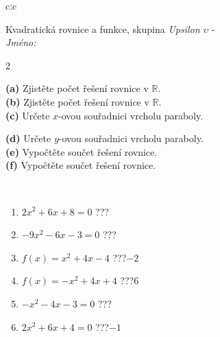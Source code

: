\documentclass[10pt]{report}
\begin{document}
\begin{tabular}{c:c}
\begin{minipage}[c][104.5mm][t]{0.5\linewidth}
\begin{center}
\vspace{7mm}
{\huge \LARGE Kvadratická rovnice a funkce, skupina \textit{Upsilon $\upsilon$} -}\\[5mm]
\textit{Jméno:}\phantom{xxxxxxxxxxxxxxxxxxxxxxxxxxxxxxxxxxxxxxxxxxxxxxxxxxxxxxxxxxxxxxxxx}\\[5mm]
\begin{minipage}{0.95\linewidth}
\begin{center}
{\small \begin{multicols}{2} \raggedright
\textbf{(a)} Zjistěte počet řešení rovnice v \(\mathbb{R}\). \\[1mm]
\textbf{(b)} Zjistěte počet řešení rovnice v \(\mathbb{R}\). \\[1mm]
\textbf{(c)} Určete \(x\)-ovou souřadnici vrcholu paraboly. \par \columnbreak
\textbf{(d)} Určete \(y\)-ovou souřadnici vrcholu paraboly. \\[1mm]
\textbf{(e)} Vypočtěte součet řešení rovnice. \\[1mm]
\textbf{(f)} Vypočtěte součet řešení rovnice.
\end{multicols}
}
\end{center}
\end{minipage}
\\[4mm]
\begin{minipage}{0.79\linewidth}
\begin{center}
\begin{varwidth}{\linewidth}
\begin{enumerate}
\Large
\item $2x^2+6x+8=0$\quad \dotfill\; ???\;\dotfill {}
\item $-9x^2-6x-3=0$\quad \dotfill\; ???\;\dotfill {}
\item $f(x)=x^2+4x-4$\quad \dotfill\; ???\;\dotfill \quad $-2$
\item $f(x)=-x^2+4x+4$\quad \dotfill\; ???\;\dotfill \quad $6$
\item $-x^2-4x-3=0$\quad \dotfill\; ???\;\dotfill {}
\item $2x^2+6x+4=0$\quad \dotfill\; ???\;\dotfill \quad $-1$
\end{enumerate}
\end{varwidth}
\end{center}
\end{minipage}

\end{center}
\end{minipage}
\end{tabular}
\end{document}
